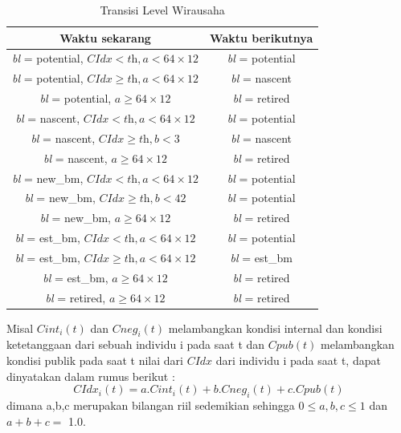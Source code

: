 \documentclass[a4paper,twoside]{article}
\begin{document}
\begin{enumerate}
\begin{enumerate}
\begin{table}[H]
\centering
\caption{Transisi Level Wirausaha}
\begin{tabular}{|c|c|}
\hline
Waktu sekarang & Waktu berikutnya \\
\hline
\textit{bl} = potential, $ \textit{CIdx} < \textit{th}, \textit{a} < 64 \times 12$ & \textit{bl} = potential \\
\hline
\textit{bl} = potential, $\textit{CIdx} \geq \textit{th}, \textit{a} < 64 \times 12$ & \textit{bl} = nascent \\
\hline
\textit{bl} = potential, $\textit{a} \geq 64 \times 12$ & \textit{bl} = retired \\
\hline
\textit{bl} = nascent, $\textit{CIdx} < \textit{th}, \textit{a} <64 \times 12$ & \textit{bl} = potential \\
\hline
\textit{bl} = nascent, $\textit{CIdx} \geq \textit{th}, \textit{b} < 3$ & \textit{bl} = nascent \\
\hline
\textit{bl} = nascent, $\textit{a} \geq 64 \times 12$ & \textit{bl} = retired \\
\hline
\textit{bl} = new\_bm, $\textit{CIdx} < \textit{th}, \textit{a} < 64 \times 12$ & \textit{bl} = potential \\
\hline
\textit{bl} = new\_bm, $\textit{CIdx} \geq \textit{th}, \textit{b} < 42$ & \textit{bl} = potential \\
\hline
\textit{bl} = new\_bm, $\textit{a} \geq 64 \times 12$ & \textit{bl} = retired \\
\hline
\textit{bl} = est\_bm, $\textit{CIdx} < \textit{th}, \textit{a} < 64 \times 12$ & \textit{bl} = potential \\
\hline
\textit{bl} = est\_bm, $\textit{CIdx} \geq \textit{th}, \textit{a} < 64 \times 12$ & \textit{bl} = est\_bm \\
\hline
\textit{bl} = est\_bm, $\textit{a} \geq 64 \times 12$ & \textit{bl} = retired \\
\hline
\textit{bl} = retired, $\textit{a} \geq 64 \times 12$ & \textit{bl} = retired \\
\hline
\end{tabular}
\label{tabelLW}
\end{table}



Misal $Cint_{i}(t)$ dan $Cneg_{i}(t)$ melambangkan kondisi internal dan kondisi ketetanggaan dari sebuah individu i pada saat t dan $Cpub(t)$ melambangkan kondisi publik pada saat t nilai dari $CIdx$ dari individu i pada saat t, dapat dinyatakan dalam rumus berikut :
\begin{displaymath}
	CIdx_{i}(t) = a.Cint_{i}(t) + b.Cneg_{i}(t) + c.Cpub(t)
\end{displaymath}
dimana a,b,c merupakan bilangan riil sedemikian sehingga $0\leq a,b,c \leq 1$ dan $a+b+c=$ 1.0.


\end{enumerate}
\end{enumerate}
\end{document}
